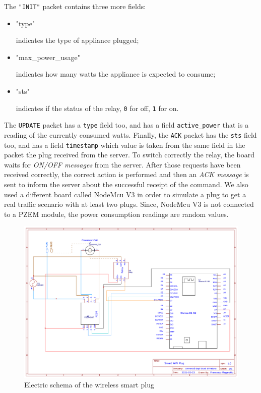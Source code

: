 \documentclass[conference]{IEEEtran}
\begin{document}
The \verb|"INIT"| packet contains three more fields:
\begin{itemize}
	\item \begin{spverbatim}"type"\end{spverbatim} indicates the type of appliance plugged;
	\item \begin{spverbatim}"max_power_usage"\end{spverbatim} indicates how many watts the appliance is expected to consume;
	\item \begin{spverbatim}"sts"\end{spverbatim} indicates if the status of the relay, \verb|0| for off, \verb|1| for on.
\end{itemize}
The \verb|UPDATE| packet has a \verb|type| field too, and has a field \verb|active_power| that is a reading of the currently consumed watts. Finally, the \verb|ACK| packet has the \verb|sts| field too, and has a field \verb|timestamp| which value is taken from the same field in the packet the plug received from the server.
To switch correctly the relay, the board waits for \textit{ON/OFF messages} from the server. After those requests have been received correctly, the correct action is performed and then an \textit{ACK message} is sent to inform the server about the successful receipt of the command. 
We also used a different board called NodeMcu V3 in order to simulate a plug to get a real traffic scenario with at least two plugs. Since, NodeMcu V3 is not connected to a PZEM module, the power consumption readings are random values.  
\begin{figure}[htbp]
	\centering
	\includegraphics[width=\linewidth]{assets/pcb_schema}
	\caption{Electric schema of the wireless smart plug}
	\label{fig:pcbschema}
\end{figure}
\end{document}
